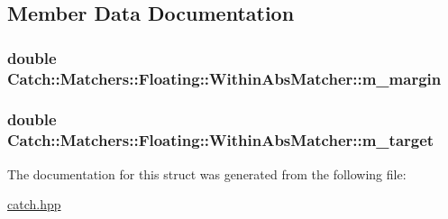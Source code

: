 \subsection{Member Data Documentation}
\hypertarget{struct_catch_1_1_matchers_1_1_floating_1_1_within_abs_matcher_a2270487cd55fa06044f5f6aaab724c5f}{
\subsubsection[{m\-\_\-margin}]{\setlength{\rightskip}{0pt plus 5cm}double Catch\-::\-Matchers\-::\-Floating\-::\-Within\-Abs\-Matcher\-::m\-\_\-margin\hspace{0.3cm}{\ttfamily [private]}}}\label{struct_catch_1_1_matchers_1_1_floating_1_1_within_abs_matcher_a2270487cd55fa06044f5f6aaab724c5f}
\hypertarget{struct_catch_1_1_matchers_1_1_floating_1_1_within_abs_matcher_a8d9f249c0e2969cf0522dc81db6ff280}{
\subsubsection[{m\-\_\-target}]{\setlength{\rightskip}{0pt plus 5cm}double Catch\-::\-Matchers\-::\-Floating\-::\-Within\-Abs\-Matcher\-::m\-\_\-target\hspace{0.3cm}{\ttfamily [private]}}}\label{struct_catch_1_1_matchers_1_1_floating_1_1_within_abs_matcher_a8d9f249c0e2969cf0522dc81db6ff280}


The documentation for this struct was generated from the following file\-:\begin{DoxyCompactItemize}
\item 
\hyperlink{catch_8hpp}{catch.\-hpp}\end{DoxyCompactItemize}

